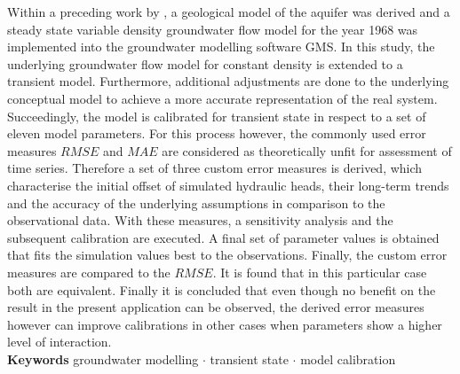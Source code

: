 Within a preceding work by \textcite{Horn.2021}, a geological model of the aquifer was derived and a steady state variable density groundwater flow model for the year 1968 was implemented into the groundwater modelling software GMS. 
In this study, the underlying groundwater flow model for constant density is extended to a transient model. 
Furthermore, additional adjustments are done to the underlying conceptual model to achieve a more accurate representation of the real system. 
Succeedingly, the model is calibrated for transient state in respect to a set of eleven model parameters. 
For this process however, the commonly used error measures $RMSE$ and $MAE$ are considered as theoretically unfit for assessment of time series. 
Therefore a set of three custom error measures is derived, which characterise the initial offset of simulated hydraulic heads, their long-term trends and the accuracy of the underlying assumptions in comparison to the observational data. 
With these measures, a sensitivity analysis and the subsequent calibration are executed. A final set of parameter values is obtained that fits the simulation values best to the observations. 
Finally, the custom error measures are compared to the $RMSE$. 
It is found that in this particular case both are equivalent. 
Finally it is concluded that even though no benefit on the result in the present application can be observed, the derived error measures however can improve calibrations in other cases when parameters show a higher level of interaction.
\\[1.0cm]
\vspace{0.5cm}
\textbf{Keywords} \hspace{0.3cm} groundwater modelling $\cdot$ transient state $\cdot$ model calibration